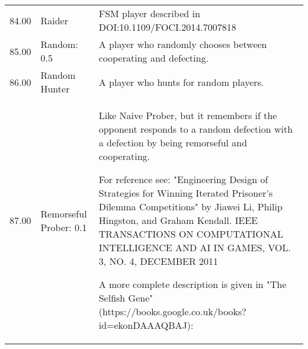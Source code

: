 \begin{tabular}{rll}
	84.00  & Raider                      & FSM player described in DOI:10.1109/FOCI.2014.7007818                                                                             \\
	85.00  & Random: 0.5                 & A player who randomly chooses between cooperating and defecting.                                                                  \\
	86.00  & Random Hunter               & A player who hunts for random players.                                                                                            \\
	87.00  & Remorseful Prober: 0.1      & Like Naive Prober, but it remembers if the opponent responds to a random
	defection with a defection by being remorseful and cooperating.

	For reference see: "Engineering Design of Strategies for Winning
	Iterated Prisoner's Dilemma Competitions" by Jiawei Li, Philip Hingston,
	and Graham Kendall.  IEEE TRANSACTIONS ON COMPUTATIONAL INTELLIGENCE AND AI
	IN GAMES, VOL. 3, NO. 4, DECEMBER 2011

	A more complete description is given in "The Selfish Gene"
	(https://books.google.co.uk/books?id=ekonDAAAQBAJ):


\end{tabular}
